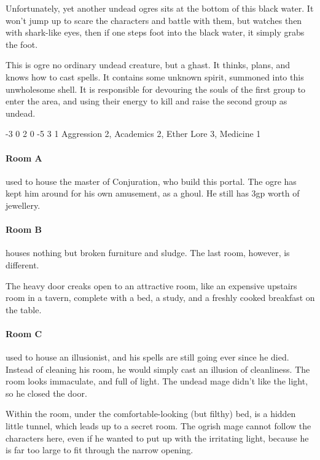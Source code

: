 \begin{multicols}{2}
Unfortunately, yet another undead ogres sits at the bottom of this black water.  It won't jump up to scare the characters and battle with them, but watches then with shark-like eyes, then if one steps foot into the black water, it simply grabs the foot.

This is ogre no ordinary undead creature, but a ghast.
It thinks, plans, and knows how to cast spells.
It contains some unknown spirit, summoned into this unwholesome shell.
It is responsible for devouring the souls of the first group to enter the area, and using their energy to kill and raise the second group as undead.

\label{undead_ogre}

  {-3}%
  {0}%
  {{2}%
  {0}%
  {-5}}%
  {3}%
  {1}%
  {Aggression 2, Academics 2, Ether Lore 3, Medicine 1}%
  {\longsword}%
  {\addtocounter{xpbonus}{3}}

\paragraph{Room A} used to house the master of Conjuration, who build this portal.
The ogre has kept him around for his own amusement, as a ghoul.
He still has 3gp worth of jewellery.

\paragraph{Room B} houses nothing but broken furniture and sludge.  The last room, however, is different.

\begin{boxtext}
  The heavy door creaks open to an attractive room, like an expensive upstairs room in a tavern, complete with a bed, a study, and a freshly cooked breakfast on the table.
\end{boxtext}

\paragraph{Room C} used to house an illusionist, and his spells are still going ever since he died.  Instead of cleaning his room, he would simply cast an illusion of cleanliness.  The room looks immaculate, and full of light.  The undead mage didn't like the light, so he closed the door.

Within the room, under the comfortable-looking (but filthy) bed, is a hidden little tunnel, which leads up to a secret room.
The ogrish mage cannot follow the characters here, even if he wanted to put up with the irritating light, because he is far too large to fit through the narrow opening.


\end{multicols}
